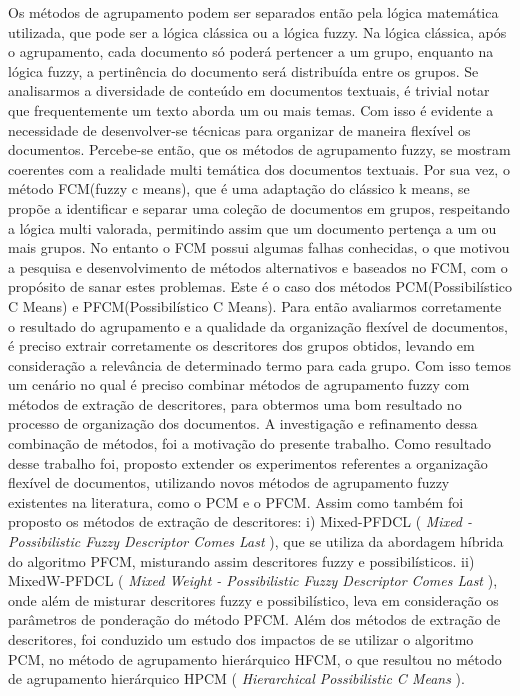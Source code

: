 Os métodos de agrupamento podem ser separados então pela lógica matemática utilizada, que pode ser a
lógica clássica ou a lógica fuzzy. Na lógica clássica, após o agrupamento, cada documento só poderá
pertencer a um grupo, enquanto na lógica fuzzy, a pertinência do documento será distribuída entre os
grupos.  Se analisarmos a diversidade de conteúdo em documentos textuais, é trivial notar que
frequentemente um texto aborda um ou mais temas. Com isso é evidente a necessidade de desenvolver-se
técnicas para organizar de maneira flexível os documentos. Percebe-se então, que os métodos de
agrupamento fuzzy, se mostram coerentes com a realidade multi temática dos documentos textuais. Por
sua vez, o método FCM(fuzzy c means), que é uma adaptação do clássico k means, se propõe a
identificar e separar uma coleção de documentos em grupos, respeitando a lógica multi valorada,
permitindo assim que um documento pertença a um ou mais grupos. No entanto o FCM possui algumas
falhas conhecidas, o que motivou a pesquisa e desenvolvimento de métodos alternativos e baseados no
FCM, com o propósito de sanar estes problemas.  Este é o caso dos métodos PCM(Possibilístico C
Means) e PFCM(Possibilístico C Means).  Para então avaliarmos corretamente o resultado do
agrupamento e a qualidade da organização flexível de documentos, é preciso extrair corretamente os
descritores dos grupos obtidos, levando em consideração a relevância de determinado termo para cada
grupo. Com isso temos um cenário no qual é preciso combinar métodos de agrupamento fuzzy com métodos
de extração de descritores, para obtermos uma bom resultado no processo de organização dos
documentos. A investigação e refinamento dessa combinação de métodos, foi a motivação do presente
trabalho. Como resultado desse trabalho foi, proposto extender os experimentos referentes a
organização flexível de documentos, utilizando novos métodos de agrupamento fuzzy existentes na
literatura, como o PCM e o PFCM. Assim como também foi proposto os métodos de extração de
descritores: i) Mixed-PFDCL ({ \it Mixed - Possibilistic Fuzzy Descriptor Comes Last\/ }), que se
utiliza da abordagem híbrida do algoritmo PFCM, misturando assim descritores fuzzy e
possibilísticos. ii) MixedW-PFDCL ({ \it Mixed Weight - Possibilistic Fuzzy Descriptor Comes Last\/
}), onde além de misturar descritores fuzzy e possibilístico, leva em consideração os parâmetros de
ponderação do método PFCM.  Além dos métodos de extração de descritores, foi conduzido um estudo dos
impactos de se utilizar o algoritmo PCM, no método de agrupamento hierárquico HFCM, o que resultou
no método de agrupamento hierárquico HPCM ({ \it Hierarchical Possibilistic C Means\/ }).
